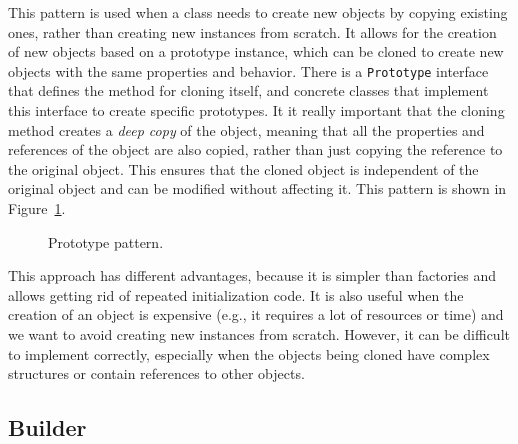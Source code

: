 This pattern is used when a class needs to create new objects by copying existing ones, rather than creating new instances from scratch. It allows for the creation of new objects based on a prototype instance, which can be cloned to create new objects with the same properties and behavior. There is a \texttt{Prototype} interface that defines the method for cloning itself, and concrete classes that implement this interface to create specific prototypes. It it really important that the cloning method creates a \emph{deep copy} of the object, meaning that all the properties and references of the object are also copied, rather than just copying the reference to the original object. This ensures that the cloned object is independent of the original object and can be modified without affecting it. This pattern is shown in Figure~\ref{fig:prototype}.
\begin{figure}
    \centering
    \caption{Prototype pattern.}
    \label{fig:prototype}
\end{figure}

This approach has different advantages, because it is simpler than factories and allows getting rid of repeated initialization code. It is also useful when the creation of an object is expensive (e.g., it requires a lot of resources or time) and we want to avoid creating new instances from scratch. However, it can be difficult to implement correctly, especially when the objects being cloned have complex structures or contain references to other objects.

\subsection{Builder}

